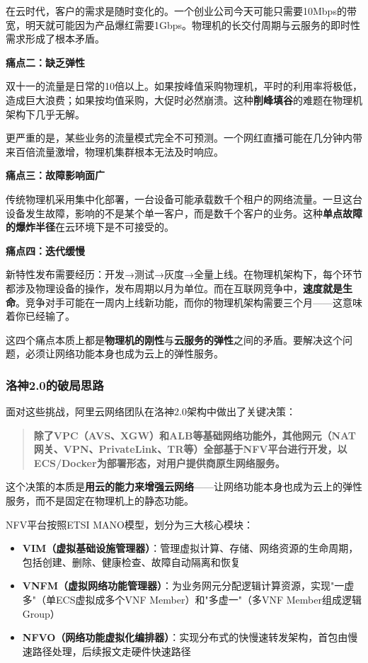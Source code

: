 在云时代，客户的需求是随时变化的。一个创业公司今天可能只需要10Mbps的带宽，明天就可能因为产品爆红需要1Gbps。物理机的长交付周期与云服务的即时性需求形成了根本矛盾。

\textbf{痛点二：缺乏弹性}

双十一的流量是日常的10倍以上。如果按峰值采购物理机，平时的利用率将极低，造成巨大浪费；如果按均值采购，大促时必然崩溃。这种\textbf{削峰填谷}的难题在物理机架构下几乎无解。

更严重的是，某些业务的流量模式完全不可预测。一个网红直播可能在几分钟内带来百倍流量激增，物理机集群根本无法及时响应。

\textbf{痛点三：故障影响面广}

传统物理机采用集中化部署，一台设备可能承载数千个租户的网络流量。一旦这台设备发生故障，影响的不是某个单一客户，而是数千个客户的业务。这种\textbf{单点故障的爆炸半径}在云环境下是不可接受的。

\textbf{痛点四：迭代缓慢}

新特性发布需要经历：开发→测试→灰度→全量上线。在物理机架构下，每个环节都涉及物理设备的操作，发布周期以月为单位。而在互联网竞争中，\textbf{速度就是生命}。竞争对手可能在一周内上线新功能，而你的物理机架构需要三个月——这意味着你已经输了。

这四个痛点本质上都是\textbf{物理机的刚性}与\textbf{云服务的弹性}之间的矛盾。要解决这个问题，必须让网络功能本身也成为云上的弹性服务。

\subsubsection{洛神2.0的破局思路}

面对这些挑战，阿里云网络团队在洛神2.0架构中做出了关键决策：

\begin{quote}
\textbf{除了VPC（AVS、XGW）和ALB等基础网络功能外，其他网元（NAT网关、VPN、PrivateLink、TR等）全部基于NFV平台进行开发，以ECS/Docker为部署形态，对用户提供商原生网络服务。}
\end{quote}

这个决策的本质是\textbf{用云的能力来增强云网络}——让网络功能本身也成为云上的弹性服务，而不是固定在物理机上的静态功能。

NFV平台按照ETSI MANO模型，划分为三大核心模块：

\begin{itemize}
    \item \textbf{VIM（虚拟基础设施管理器）}：管理虚拟计算、存储、网络资源的生命周期，包括创建、删除、健康检查、故障自动隔离和恢复
    \item \textbf{VNFM（虚拟网络功能管理器）}：为业务网元分配逻辑计算资源，实现"一虚多"（单ECS虚拟成多个VNF Member）和"多虚一"（多VNF Member组成逻辑Group）
    \item \textbf{NFVO（网络功能虚拟化编排器）}：实现分布式的快慢速转发架构，首包由慢速路径处理，后续报文走硬件快速路径
\end{itemize}

